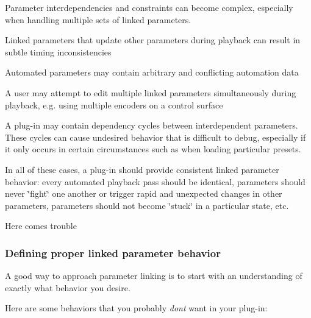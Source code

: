 \begin{DoxyItemize}
\item Parameter interdependencies and constraints can become complex, especially when handling multiple sets of linked parameters.
\item Linked parameters that update other parameters during playback can result in subtle timing inconsistencies
\item Automated parameters may contain arbitrary and conflicting automation data
\item A user may attempt to edit multiple linked parameters simultaneously during playback, e.\+g. using multiple encoders on a control surface
\item A plug-\/in may contain dependency cycles between interdependent parameters. These cycles can cause undesired behavior that is difficult to debug, especially if it only occurs in certain circumstances such as when loading particular presets.
\end{DoxyItemize}

In all of these cases, a plug-\/in should provide consistent linked parameter behavior\+: every automated playback pass should be identical, parameters should never \char`\"{}fight\char`\"{} one another or trigger rapid and unexpected changes in other parameters, parameters should not become \char`\"{}stuck\char`\"{} in a particular state, etc.

 Here comes trouble\hypertarget{a00824_linkedParameters_behavior}{}\subsubsection{Defining proper linked parameter behavior}\label{a00824_linkedParameters_behavior}
A good way to approach parameter linking is to start with an understanding of exactly what behavior you desire.

Here are some behaviors that you probably {\itshape don\textquotesingle{}t} want in your plug-\/in\+:


